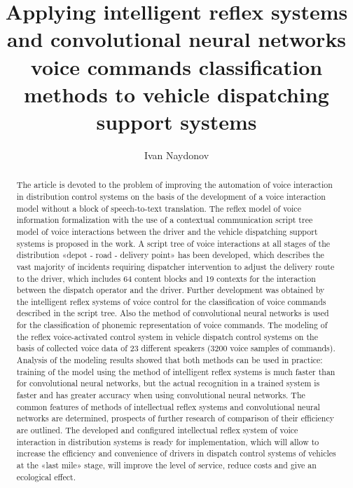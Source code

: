 \documentclass[review,authoryear]{elsarticle}
\begin{document}
\begin{frontmatter}
	
	\title{Applying intelligent reflex systems and convolutional neural networks voice commands classification methods to vehicle dispatching support systems}
	
	\author[1]{Ivan Naydonov}
	\address[1]{Taras Shevchenko National University of Kyiv, 60 Volodymyrska Street, Kyiv, Ukraine, 01033}
	
	\begin{abstract}
		The article is devoted to the problem of improving the automation of voice interaction in distribution control systems on the basis of the development of a voice interaction model without a block of speech-to-text translation. The reflex model of voice information formalization with the use of a contextual communication script tree model of voice interactions between the driver and the vehicle dispatching support systems is proposed in the work. A script tree of voice interactions at all stages of the distribution «depot - road - delivery point» has been developed, which describes the vast majority of incidents requiring dispatcher intervention to adjust the delivery route to the driver, which includes 64 content blocks and 19 contexts for the interaction between the dispatch operator and the driver. Further development was obtained by the intelligent reflex systems of voice control for the classification of voice commands described in the script tree. Also the method of convolutional neural networks is used for the classification of phonemic representation of voice commands. The modeling of the reflex voice-activated control system  in vehicle dispatch control systems on the basis of collected voice data of 23 different speakers (3200 voice samples of commands). Analysis of the modeling results showed that both methods can be used in practice: training of the model using the method of intelligent reflex systems is much faster than for convolutional neural networks, but the actual recognition in a trained system is faster and has greater accuracy when using convolutional neural networks. The common features of methods of intellectual reflex systems and convolutional neural networks are determined, prospects of further research of comparison of their efficiency are outlined. The developed and configured intellectual reflex system of voice interaction in distribution systems is ready for implementation, which will allow to increase the efficiency and convenience of drivers in dispatch control systems of vehicles at the «last mile» stage, will improve the level of service, reduce costs and give an ecological effect.
	\end{abstract}
	

\end{frontmatter}
\end{document}
